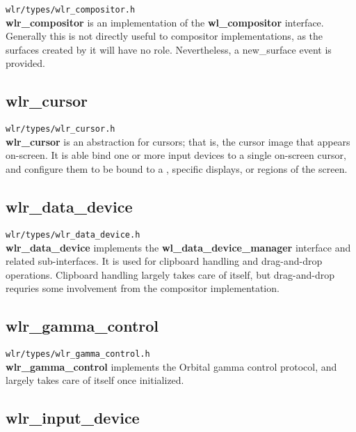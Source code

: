 \documentclass{article}
\newcommand{\code}[1]{\texttt{#1}}
\begin{document}
\code{wlr/types/wlr_compositor.h}\\

\textbf{wlr_compositor} is an implementation of the \textbf{wl_compositor}
interface. Generally this is not directly useful to compositor implementations,
as the surfaces created by it will have no role. Nevertheless, a new_surface
event is provided.

\subsection{wlr_cursor}\label{wlr cursor}

\code{wlr/types/wlr_cursor.h}\\

\textbf{wlr_cursor} is an abstraction for cursors; that is, the cursor image
that appears on-screen. It is able bind one or more input devices to a single
on-screen cursor, and configure them to be bound to a , specific displays, or regions of the screen.

\subsection{wlr_data_device}\label{wlr data device}

\code{wlr/types/wlr_data_device.h}\\

\textbf{wlr_data_device} implements the \textbf{wl_data_device_manager}
interface and related sub-interfaces. It is used for clipboard handling and
drag-and-drop operations. Clipboard handling largely takes care of itself, but
drag-and-drop requries some involvement from the compositor implementation.

\subsection{wlr_gamma_control}\label{wlr gamma control}

\code{wlr/types/wlr_gamma_control.h}\\

\textbf{wlr_gamma_control} implements the Orbital gamma control protocol, and
largely takes care of itself once initialized.

\subsection{wlr_input_device}\label{wlr input device}
\end{document}

